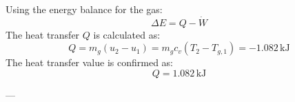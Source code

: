 Using the energy balance for the gas:  
\[
\Delta E = Q - \dot{W}  
\]  
The heat transfer \( Q \) is calculated as:  
\[
Q = m_g (u_2 - u_1) = m_g c_v (T_2 - T_{g,1}) = -1.082 \, \text{kJ}  
\]  
The heat transfer value is confirmed as:  
\[
Q = 1.082 \, \text{kJ}  
\]  

---